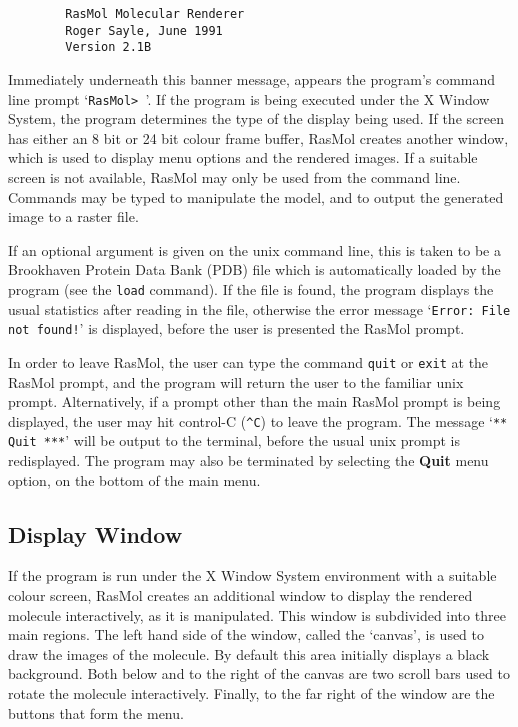 \begin{verbatim}
        RasMol Molecular Renderer
        Roger Sayle, June 1991
        Version 2.1B
\end{verbatim}

Immediately underneath this banner message, appears the program's command
line prompt `{\tt RasMol>~}'. If the program is being executed under the
X Window System, the program determines the type of the display being used.
If the screen has either an 8 bit or 24 bit colour frame buffer, RasMol
creates another window, which is used to display menu options and the
rendered images. If a suitable screen is not available, RasMol may only be
used from the command line. Commands may be typed to manipulate the model,
and to output the generated image to a raster file.

If an optional argument is given on the unix command line, this is taken
to be a Brookhaven Protein Data Bank (PDB) file which is automatically
loaded by the program (see the {\tt load} command). If the file is found,
the program displays the usual statistics after reading in the file,
otherwise the error message `{\tt Error: File not found!}' is displayed,
before the user is presented the RasMol prompt.


In order to leave RasMol, the user can type the command {\tt quit} or 
{\tt exit} at the RasMol prompt, and the program will return the user to
the familiar unix prompt. Alternatively, if a prompt other than the main
RasMol prompt is being displayed, the user may hit control-C (\verb"^C")
to leave the program. The message `{\tt *** Quit ***}' will be output to
the terminal, before the usual unix prompt is redisplayed. The program may
also be terminated by selecting the {\bf Quit} menu option, on the bottom
of the main menu.


\subsection{Display Window}
\label{Window}
If the program is run under the X Window System environment with a suitable
colour screen, RasMol creates an additional window to display the rendered
molecule interactively, as it is manipulated. This window is subdivided into
three main regions. The left hand side of the window, called the `canvas',
is used to draw the images of the molecule. By default this area initially
displays a black background.  Both below and to the right of the canvas are
two scroll bars used to rotate the molecule interactively. Finally, to the
far right of the window are the buttons that form the menu.


